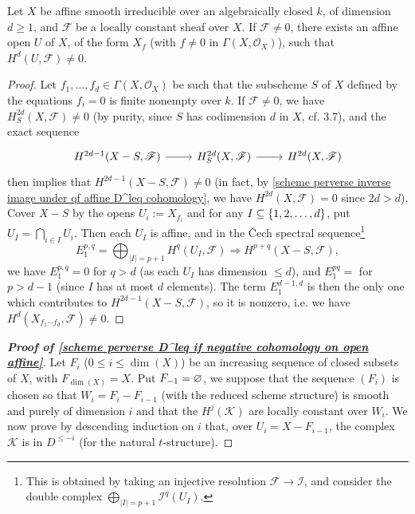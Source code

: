 \begin{lemma}\label{scheme affine smooth over ac field cohomology over affine nonzero}
Let $X$ be affine smooth irreducible over an algebraically closed $k$, of dimension $d\geq 1$, and $\mathscr{F}$ be a locally constant sheaf over $X$. If $\mathscr{F}\neq 0$, there exists an affine open $U$ of $X$, of the form $X_f$ (with $f\neq 0$ in $\Gamma(X,\mathscr{O}_X)$), such that $H^d(U,\mathscr{F})\neq 0$.
\end{lemma}
\begin{proof}
Let $f_1,\dots,f_d\in\Gamma(X,\mathscr{O}_X)$ be such that the subscheme $S$ of $X$ defined by the equations $f_i=0$ is finite nonempty over $k$. If $\mathscr{F}\neq 0$, we have $H_S^{2d}(X,\mathscr{F})\neq 0$ (by purity, since $S$ has codimension $d$ in $X$, cf. \cite{SGA4-3}  3.7), and the exact sequence
\[\begin{tikzcd}
H^{2d-1}(X-S,\mathscr{F})\ar[r]&H_S^{2d}(X,\mathscr{F})\ar[r]&H^{2d}(X,\mathscr{F})
\end{tikzcd}\]
then implies that $H^{2d-1}(X-S,\mathscr{F})\neq 0$ (in fact, by \cref{scheme perverse inverse image under qf affine D^leq cohomology}, we have $H^{2d}(X,\mathscr{F})=0$ since $2d>d$). Cover $X-S$ by the opens $U_i:=X_{f_i}$ and for any $I\subseteq\{1,2,\dots,d\}$, put $U_I=\bigcap_{i\in I}U_i$. Then each $U_I$ is affine, and in the \v{C}ech spectral sequence\footnote{This is obtained by taking an injective resolution $\mathscr{F}\to\mathscr{I}$, and consider the double complex $\bigoplus_{|I|=p+1}\mathscr{I}^q(U_I)$.}
\[E_1^{p,q}=\bigoplus_{|I|=p+1}H^q(U_I,\mathscr{F})\Rightarrow H^{p+q}(X-S,\mathscr{F}),\]
we have $E_1^{p,q}=0$ for $q>d$ (as each $U_I$ has dimension $\leq d$), and $E_1^{pq}=$ for $p>d-1$ (since $I$ has at most $d$ elements). The term $E_1^{d-1,d}$ is then the only one which contributes to $H^{2d-1}(X-S,\mathscr{F})$, so it is nonzero, i.e. we have $H^d(X_{f_1\cdots f_d},\mathscr{F})\neq 0$.
\end{proof}

\begin{proof}[\textbf{Proof of \cref{scheme perverse D^leq if negative cohomology on open affine}}]
Let $F_i$ ($0\leq i\leq\dim(X)$) be an increasing sequence of closed subsets of $X$, with $F_{\dim(X)}=X$. Put $F_{-1}=\varnothing$, we suppose that the sequence $(F_i)$ is chosen so that $W_i=F_i-F_{i-1}$ (with the reduced scheme structure) is smooth and purely of dimension $i$ and that the $H^j(\mathscr{K})$ are locally constant over $W_i$. We now prove by descending induction on $i$ that, over $U_i=X-F_{i-1}$, the complex $\mathscr{K}$ is in $D^{\leq -i}$ (for the natural $t$-structure).\par

\end{proof}

